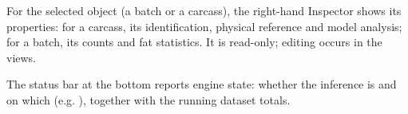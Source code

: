 \begin{note}[title=The Inspector tracks the current selection]
For the selected object (a batch or a carcass), the right-hand Inspector shows
its properties: for a carcass, its identification, physical reference and model
analysis; for a batch, its counts and fat statistics. It is read-only; editing
occurs in the views.
\end{note}

The status bar at the bottom reports engine state: whether the inference
 is  and on which  (e.g. ),
together with the running dataset totals.
